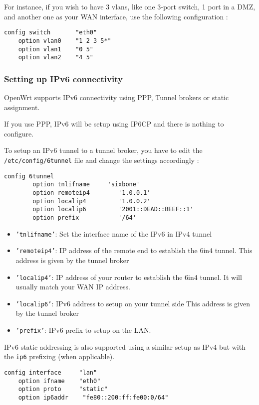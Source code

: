 For instance, if you wish to have 3 vlans, like one 3-port switch, 1 port in a
DMZ, and another one as your WAN interface, use the following configuration :

\begin{Verbatim}
config switch       "eth0"
    option vlan0    "1 2 3 5*"
    option vlan1    "0 5"
    option vlan2    "4 5"
\end{Verbatim}

\subsubsection{Setting up IPv6 connectivity}

OpenWrt supports IPv6 connectivity using PPP, Tunnel brokers or static
assignment.

If you use PPP, IPv6 will be setup using IP6CP and there is nothing to
configure.

To setup an IPv6 tunnel to a tunnel broker, you have to edit the
\texttt{/etc/config/6tunnel} file and change the settings accordingly :

\begin{Verbatim}
config 6tunnel
        option tnlifname     'sixbone'
        option remoteip4        '1.0.0.1'
        option localip4         '1.0.0.2'
        option localip6         '2001::DEAD::BEEF::1'
        option prefix           '/64'
\end{Verbatim}

\begin{itemize}
    \item{\texttt{'tnlifname'}:}
        Set the interface name of the IPv6 in IPv4 tunnel
    \item{\texttt{'remoteip4'}:}
        IP address of the remote end to establish the 6in4 tunnel.
	This address is given by the tunnel broker
    \item{\texttt{'localip4'}:}
	IP address of your router to establish the 6in4 tunnel.
	It will usually match your WAN IP address.
    \item{\texttt{'localip6'}:}
	IPv6 address to setup on your tunnel side
	This address is given by the tunnel broker
    \item{\texttt{'prefix'}:}
	IPv6 prefix to setup on the LAN.
\end{itemize}

IPv6 static addressing is also supported using a similar setup as
IPv4 but with the \texttt{ip6} prefixing (when applicable).

\begin{Verbatim}
config interface     "lan"
    option ifname    "eth0"
    option proto     "static"
    option ip6addr    "fe80::200:ff:fe00:0/64"
\end{Verbatim}
